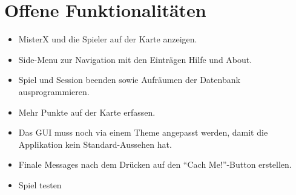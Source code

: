 \documentclass[11pt]{article}
\begin{document}
\section{Offene Funktionalitäten}
\begin{itemize}
\item MisterX und die Spieler auf der Karte anzeigen.
\item Side-Menu zur Navigation mit den Einträgen Hilfe und About.
\item Spiel und Session beenden sowie Aufräumen der Datenbank ausprogrammieren.
\item Mehr Punkte auf der Karte erfassen.
\item Das GUI muss noch via einem Theme angepasst werden, damit die Applikation kein Standard-Aussehen hat.
\item Finale Messages nach dem Drücken auf den ``Cach Me!''-Button erstellen.
\item Spiel testen
\end{itemize}
 
\end{document}

